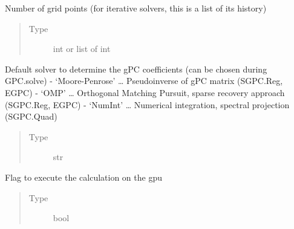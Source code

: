 \documentclass[letterpaper,10pt,english,openany,oneside]{sphinxmanual}
\begin{document}
\begin{fulllineitems}
\begin{fulllineitems}
\begin{quote}
\begin{description}
\end{description}\end{quote}

\end{fulllineitems}


\begin{fulllineitems}
\label{\detokenize{pygpc:pygpc.GPC.GPC.n_grid}}
Number of grid points (for iterative solvers, this is a list of its history)
\begin{quote}\begin{description}
\item[{Type}] \leavevmode
int or list of int

\end{description}\end{quote}

\end{fulllineitems}


\begin{fulllineitems}
\label{\detokenize{pygpc:pygpc.GPC.GPC.solver}}
Default solver to determine the gPC coefficients (can be chosen during GPC.solve)
- ‘Moore-Penrose’ … Pseudoinverse of gPC matrix (SGPC.Reg, EGPC)
- ‘OMP’ … Orthogonal Matching Pursuit, sparse recovery approach (SGPC.Reg, EGPC)
- ‘NumInt’ … Numerical integration, spectral projection (SGPC.Quad)
\begin{quote}\begin{description}
\item[{Type}] \leavevmode
str

\end{description}\end{quote}

\end{fulllineitems}


\begin{fulllineitems}
\label{\detokenize{pygpc:pygpc.GPC.GPC.gpu}}
Flag to execute the calculation on the gpu
\begin{quote}\begin{description}
\item[{Type}] \leavevmode
bool


\end{description}
\end{quote}
\end{fulllineitems}
\end{fulllineitems}
\end{document}
